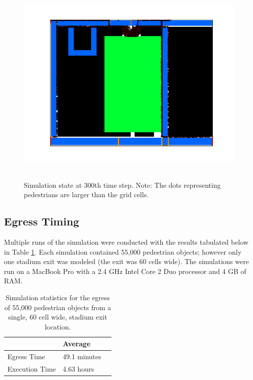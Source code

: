 \documentclass[paper=a4, fontsize=11pt]{scrartcl}
\numberwithin{equation}{section}		%
\numberwithin{figure}{section}			%
\numberwithin{table}{section}		    %
\begin{document}
\begin{figure}[H]
	\begin{center}
		\includegraphics[height=4in,width=5.5in]{sim_300} 
		\caption{Simulation state at 300th time step. Note: The dots representing pedestrians are 
		larger than the grid cells.\label{fig:sim_500}}
	\end{center} 
\end{figure}

\subsection{Egress Timing}
Multiple runs of the simulation were conducted with the results tabulated below in Table 
\ref{tbl:stats}. Each simulation contained 55,000 pedestrian objects; however only one stadium exit 
was modeled (the exit was 60 cells wide). The simulations were run on a MacBook Pro with a 2.4 GHz 
Intel Core 2 Duo processor 
and 4 GB of RAM.

\begin{table}[H]
	\centering
	\caption{Simulation statistics for the egress of 55,000 pedestrian objects from a single, 60 
	cell wide, stadium exit location.}
	\label{tbl:stats}
	\begin{tabular}{|l|l|l|}
		\hline
		               & Average      \\ \hline
		Egress Time    & 49.1 minutes \\ \hline
		Execution Time & 4.63 hours   \\ \hline
	\end{tabular}
\end{table}
\end{document}
